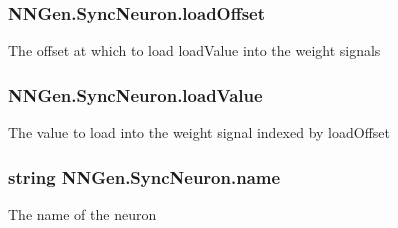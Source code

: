 \hypertarget{class_n_n_gen_1_1_sync_neuron_a1ad5ac56ac0278154e84eeeb4ae09604}{}
\subsubsection[{load\+Offset}]{ N\+N\+Gen.\+Sync\+Neuron.\+load\+Offset\hspace{0.3cm}{\ttfamily [get]}}\label{class_n_n_gen_1_1_sync_neuron_a1ad5ac56ac0278154e84eeeb4ae09604}


The offset at which to load load\+Value into the weight signals 

\hypertarget{class_n_n_gen_1_1_sync_neuron_a4334c7219b366b989108a9451ff3c409}{}
\subsubsection[{load\+Value}]{ N\+N\+Gen.\+Sync\+Neuron.\+load\+Value\hspace{0.3cm}{\ttfamily [get]}}\label{class_n_n_gen_1_1_sync_neuron_a4334c7219b366b989108a9451ff3c409}


The value to load into the weight signal indexed by load\+Offset 

\hypertarget{class_n_n_gen_1_1_sync_neuron_a52bca099e4e4dca870213d0bdc0a734d}{}
\subsubsection[{name}]{\setlength{\rightskip}{0pt plus 5cm}string N\+N\+Gen.\+Sync\+Neuron.\+name\hspace{0.3cm}{\ttfamily [get]}}\label{class_n_n_gen_1_1_sync_neuron_a52bca099e4e4dca870213d0bdc0a734d}


The name of the neuron 

\hypertarget{class_n_n_gen_1_1_sync_neuron_a717f010aa22ec2a35ec0f314549a3177}{}
